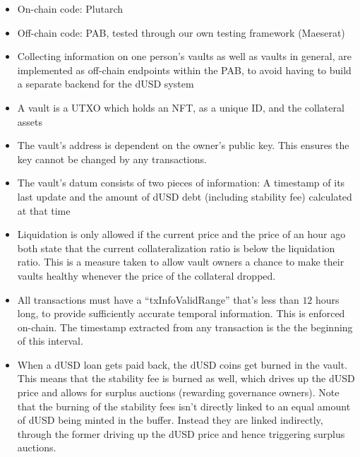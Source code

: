 \documentclass{article} %
\begin{document}
\begin{itemize}
  \item On-chain code: Plutarch
  \item Off-chain code: PAB, tested through our own testing framework (Maeserat)
  \item Collecting information on one person's vaults as well as vaults in
    general, are implemented as off-chain endpoints within the PAB, to avoid
    having to build a separate backend for the dUSD system
  \item A vault is a UTXO which holds an NFT, as a unique ID, and the collateral
    assets
  \item The vault's address is dependent on the owner's public key. This ensures
    the key cannot be changed by any transactions.
  \item The vault's datum consists of two pieces of information: A timestamp of
    its last update and the amount of dUSD debt (including stability fee)
    calculated at that time
  \item Liquidation is only allowed if the current price and the price of an
    hour ago both state that the current collateralization ratio is below the
    liquidation ratio.
    This is a measure taken to allow vault owners a chance to make their vaults
    healthy whenever the price of the collateral dropped.
  \item All transactions must have a ``txInfoValidRange'' that's less than $12$
    hours long, to provide sufficiently accurate temporal information. This is
    enforced on-chain. The timestamp extracted from any transaction is the the
    beginning of this interval.
  \item When a dUSD loan gets paid back, the dUSD coins get burned in the vault.
    This means that the stability fee is burned as well, which drives up the
    dUSD price and allows for surplus auctions (rewarding governance owners).
    Note that the burning of the stability fees isn't directly linked to an
    equal amount of dUSD being minted in the buffer.
    Instead they are linked indirectly, through the former driving up the dUSD
    price and hence triggering surplus auctions.
\end{itemize}

\end{document}
